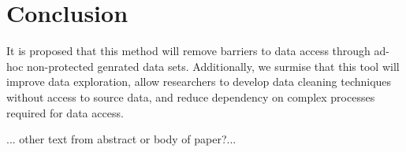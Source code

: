 \documentclass{article}
\begin{document}
\section{Conclusion}

It is proposed that this method will remove barriers to data access through ad-hoc non-protected genrated data sets. Additionally, we surmise that this tool will improve data exploration, allow researchers to develop data cleaning techniques without access to source data, and reduce dependency on complex processes required for data access.

... other text from abstract or body of paper?...




\end{document}
